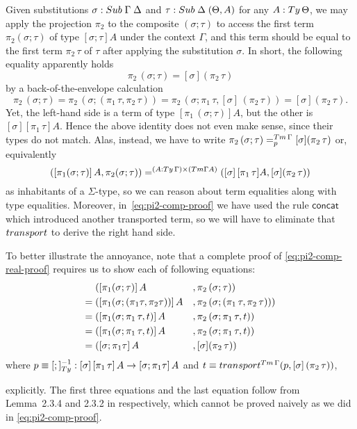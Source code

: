 \documentclass[a4paper,UKenglish,numberwithinsect,cleveref,thm-restate]{lipics-v2021}
\begin{document}
\begin{example}
  Given substitutions $\sigma : \Sub\;\Gamma\; \Delta$ and $\tau : \Sub\;\Delta\;(\Theta, A)$ for any $A : \Ty\,\Theta$, we may apply the projection $\pi_2$ to the composite $(\sigma; \tau)$ to access the first term $\pi_2(\sigma; \tau)$ of type $[\sigma;\tau] A$ under the context $\Gamma$, and this term should be equal to the first term $\pi_2\,\tau$ of $\tau$ after applying the substitution $\sigma$. 
  In short, the following equality apparently holds
  \[
    \pi_2\,(\sigma ; \tau) = [\sigma] (\pi_2\,\tau)
  \]
  by a back-of-the-envelope calculation
  \begin{equation} \label{eq:pi2-comp-proof}
    \pi_2\,(\sigma ; \tau) 
    = \pi_2\,(\sigma; (\pi_1\,\tau, \pi_2\,\tau))
    = \pi_2\,(\sigma;\pi_1\,\tau, [\sigma]\,(\pi_2\,\tau))
    = [\sigma] (\pi_2\,\tau).
  \end{equation}
  Yet, the left-hand side is a term of type $[\pi_1\,(\sigma;\tau)] A$, but the other is $[\sigma] [\pi_1\,\tau] A$.
  Hence the above identity does not even make sense, since their types do not match.
  Alas, instead, we have to write $\pi_2\,(\sigma ; \tau) =^{\Tm\,\Gamma}_{p} [\sigma] (\pi_2\,\tau)$ or, equivalently
  \begin{equation}\label{eq:pi2-comp-real-proof}
    ([\pi_1(\sigma; \tau)]\,A, \pi_2(\sigma; \tau)) =^{(A : \Ty\,\Gamma) \times (\Tm \Gamma A)} ([\sigma]\,[\pi_1\,\tau]A, [\sigma] (\pi_2\,\tau))
  \end{equation}
  as inhabitants of a $\Sigma$-type, so we can reason about term equalities along with type equalities.
  Moreover, in~\eqref{eq:pi2-comp-proof} we have used the rule $\mathsf{concat}$ which introduced another transported term, so we will have to eliminate that $\transp$ to derive the right hand side.

  To better illustrate the annoyance, note that a complete proof of \eqref{eq:pi2-comp-real-proof} requires us to show each of following equations:
  \begin{alignat*}{3}
         & ([\pi_1(\sigma; \tau)]\,A                    &&, \pi_2\,(\sigma ; \tau)) \label{eq:pi2-proof-1} \\
    = {} & ([\pi_1(\sigma; (\pi_1\tau , \pi_2\tau))]\,A &&, \pi_2\,(\sigma; (\pi_1\,\tau, \pi_2\,\tau))) \\
    = {} & ([\pi_1(\sigma;\pi_1\,\tau, t)]\,A &&, \pi_2\,(\sigma;\pi_1\,\tau, t)) \\
    = {} & ([\pi_1(\sigma;\pi_1\,\tau, t)]\,A &&, \pi_2\,(\sigma;\pi_1\,\tau, t)) \nonumber \\
    = {} & ([\sigma;\pi_1\tau]\,{A} &&, [\sigma] (\pi_2\,\tau)) \nonumber
  \end{alignat*}
  where $p \judgeq [;]_{\Ty}^{-1} : \sub{\sigma}{\sub{\pi_1\,\tau}{A}} \to \sub{\sigma; \pi_1 \tau}{A}$ and $t \judgeq\transfib{\Tm\,\Gamma}{p}{[\sigma]\,(\pi_2\,\tau)}$,
\end{example}
explicitly.
The first three equations and the last equation follow from Lemma~2.3.4 and 2.3.2 in \cite{UFP2013} respectively, which cannot be proved naively as we did in \eqref{eq:pi2-comp-proof}.
\end{document}
